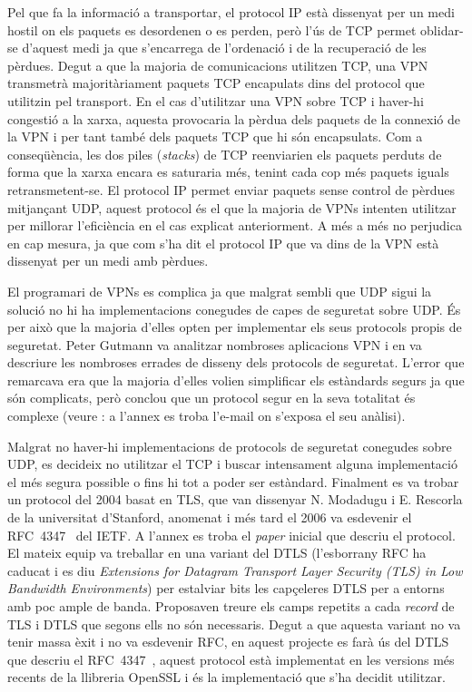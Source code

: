 Pel que fa la informació a transportar, el protocol IP està dissenyat per un medi hostil on els paquets es desordenen o es perden, però l'ús de TCP permet oblidar-se d'aquest medi ja que s'encarrega de l'ordenació i de la recuperació de les pèrdues. Degut a que la majoria de comunicacions utilitzen TCP, una VPN transmetrà majoritàriament paquets TCP encapulats dins del protocol que utilitzin pel transport.
En el cas d'utilitzar una VPN sobre TCP i haver-hi congestió a la xarxa, aquesta provocaria la pèrdua dels paquets de la connexió de la VPN i per tant també dels paquets TCP que hi són encapsulats. Com a conseqüència, les dos piles (\emph{stacks}) de TCP reenviarien els paquets perduts de forma que la xarxa encara es saturaria més, tenint cada cop més paquets iguals retransmetent-se.
El protocol IP permet enviar paquets sense control de pèrdues mitjançant UDP, aquest protocol és el que la majoria de VPNs intenten utilitzar per millorar l'eficiència en el cas explicat anteriorment. A més a més no  perjudica en cap mesura, ja que com s'ha dit el protocol IP que va dins de la VPN està dissenyat per un medi amb pèrdues.

El programari de VPNs es complica ja que malgrat sembli que UDP sigui la solució no hi ha implementacions conegudes de capes de seguretat sobre UDP. És per això que la majoria d'elles opten per implementar els seus protocols propis de seguretat.
Peter Gutmann va analitzar nombroses aplicacions VPN i en va descriure les nombroses errades de disseny dels protocols de seguretat. L'error que remarcava era que la majoria d'elles volien simplificar els estàndards segurs ja que són complicats, però conclou que un protocol segur en la seva totalitat és complexe (veure \cite{latm-metzdowd}: a l'annex  es troba l'e-mail on s'exposa el seu anàlisi).

Malgrat no haver-hi implementacions de protocols de seguretat conegudes sobre UDP, es decideix no utilitzar el TCP i buscar intensament alguna implementació el més segura possible o fins hi tot a poder ser estàndard. Finalment es va trobar un protocol del 2004 basat en TLS, que van dissenyar N. Modadugu i E. Rescorla de la universitat d'Stanford, anomenat  i més tard el 2006 va esdevenir el RFC~4347~\cite{rfc4347} del IETF. A l'annex  es troba el \emph{paper} inicial que descriu el protocol. El mateix equip va treballar en una variant del DTLS \cite{rfc-dtls-short} (l'esborrany RFC ha caducat i es diu \emph{Extensions for Datagram Transport Layer Security (TLS) in Low Bandwidth Environments}) per estalviar bits les capçeleres DTLS per a entorns amb poc ample de banda. Proposaven treure els camps repetits a cada \emph{record} de TLS i DTLS que segons ells no són necessaris. Degut a que aquesta variant no va tenir massa èxit i no va esdevenir RFC, en aquest projecte es farà ús del DTLS que descriu el RFC~4347~\cite{rfc4347}, aquest protocol està implementat en les versions més recents de la llibreria OpenSSL i és la implementació que s'ha decidit utilitzar.

